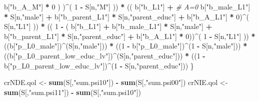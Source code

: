 \documentclass[
]{book}
\newenvironment{Shaded}{\begin{snugshade}}{\end{snugshade}}
\newcommand{\CommentTok}[1]{\textcolor[rgb]{0.56,0.35,0.01}{\textit{#1}}}
\newcommand{\DecValTok}[1]{\textcolor[rgb]{0.00,0.00,0.81}{#1}}
\newcommand{\FunctionTok}[1]{\textcolor[rgb]{0.13,0.29,0.53}{\textbf{#1}}}
\newcommand{\NormalTok}[1]{#1}
\newcommand{\OtherTok}[1]{\textcolor[rgb]{0.56,0.35,0.01}{#1}}
\newcommand{\SpecialCharTok}[1]{\textcolor[rgb]{0.81,0.36,0.00}{\textbf{#1}}}
\newcommand{\StringTok}[1]{\textcolor[rgb]{0.31,0.60,0.02}{#1}}
\begin{document}
\begin{Shaded}
\begin{Highlighting}[]
\NormalTok{                b[}\StringTok{"b\_A\_M"}\NormalTok{] }\SpecialCharTok{*} \DecValTok{0}\NormalTok{ ) )}\SpecialCharTok{\^{}}\NormalTok{( }\DecValTok{1} \SpecialCharTok{{-}}\NormalTok{ S[n,}\StringTok{"M"}\NormalTok{] )) }\SpecialCharTok{*}
\NormalTok{      (( b[}\StringTok{"b\_L1"}\NormalTok{] }\SpecialCharTok{+}                                                            \CommentTok{\# A=0}
\NormalTok{           b[}\StringTok{"b\_male\_L1"}\NormalTok{] }\SpecialCharTok{*}\NormalTok{ S[n,}\StringTok{"male"}\NormalTok{] }\SpecialCharTok{+}  
\NormalTok{           b[}\StringTok{"b\_parent\_L1"}\NormalTok{] }\SpecialCharTok{*}\NormalTok{ S[n,}\StringTok{"parent\_educ"}\NormalTok{] }\SpecialCharTok{+}
\NormalTok{           b[}\StringTok{"b\_A\_L1"}\NormalTok{] }\SpecialCharTok{*} \DecValTok{0}\NormalTok{)}\SpecialCharTok{\^{}}\NormalTok{( S[n,}\StringTok{"L1"}\NormalTok{] )) }\SpecialCharTok{*}
\NormalTok{      (( }\DecValTok{1} \SpecialCharTok{{-}}\NormalTok{ ( b[}\StringTok{"b\_L1"}\NormalTok{] }\SpecialCharTok{+}
\NormalTok{                 b[}\StringTok{"b\_male\_L1"}\NormalTok{] }\SpecialCharTok{*}\NormalTok{ S[n,}\StringTok{"male"}\NormalTok{] }\SpecialCharTok{+}  
\NormalTok{                 b[}\StringTok{"b\_parent\_L1"}\NormalTok{] }\SpecialCharTok{*}\NormalTok{ S[n,}\StringTok{"parent\_educ"}\NormalTok{] }\SpecialCharTok{+}
\NormalTok{                 b[}\StringTok{"b\_A\_L1"}\NormalTok{] }\SpecialCharTok{*} \DecValTok{0}\NormalTok{))}\SpecialCharTok{\^{}}\NormalTok{( }\DecValTok{1} \SpecialCharTok{{-}}\NormalTok{ S[n,}\StringTok{"L1"}\NormalTok{] )) }\SpecialCharTok{*}
\NormalTok{      ((b[}\StringTok{"p\_L0\_male"}\NormalTok{])}\SpecialCharTok{\^{}}\NormalTok{(S[n,}\StringTok{"male"}\NormalTok{])) }\SpecialCharTok{*} 
\NormalTok{      ((}\DecValTok{1} \SpecialCharTok{{-}}\NormalTok{ b[}\StringTok{"p\_L0\_male"}\NormalTok{])}\SpecialCharTok{\^{}}\NormalTok{(}\DecValTok{1} \SpecialCharTok{{-}}\NormalTok{ S[n,}\StringTok{"male"}\NormalTok{])) }\SpecialCharTok{*} 
\NormalTok{      ((b[}\StringTok{"p\_L0\_parent\_low\_educ\_lv"}\NormalTok{])}\SpecialCharTok{\^{}}\NormalTok{(S[n,}\StringTok{"parent\_educ"}\NormalTok{])) }\SpecialCharTok{*}
\NormalTok{      ((}\DecValTok{1} \SpecialCharTok{{-}}\NormalTok{ b[}\StringTok{"p\_L0\_parent\_low\_educ\_lv"}\NormalTok{])}\SpecialCharTok{\^{}}\NormalTok{(}\DecValTok{1} \SpecialCharTok{{-}}\NormalTok{ S[n,}\StringTok{"parent\_educ"}\NormalTok{])) }
\NormalTok{    \}}
  
\NormalTok{  crNDE.qol }\OtherTok{\textless{}{-}} \FunctionTok{sum}\NormalTok{(S[,}\StringTok{"sum.psi10"}\NormalTok{]) }\SpecialCharTok{{-}} \FunctionTok{sum}\NormalTok{(S[,}\StringTok{"sum.psi00"}\NormalTok{])}
\NormalTok{  crNIE.qol }\OtherTok{\textless{}{-}} \FunctionTok{sum}\NormalTok{(S[,}\StringTok{"sum.psi11"}\NormalTok{]) }\SpecialCharTok{{-}} \FunctionTok{sum}\NormalTok{(S[,}\StringTok{"sum.psi10"}\NormalTok{])}
  

\end{Highlighting}
\end{Shaded}
\end{document}
